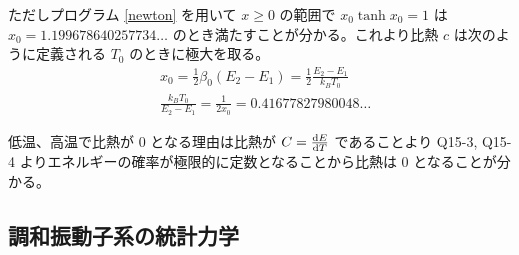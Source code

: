 \documentclass[uplatex,diffipdfmx,a4paper,11pt]{jlreq}
\theoremstyle{definition}
\begin{document}
ただしプログラム \ref{newton} を用いて $x\geq 0$ の範囲で $x_0\tanh x_0 = 1$ は $x_0 = 1.199678640257734\ldots$ のとき満たすことが分かる。これより比熱 $c$ は次のように定義される $T_0$ のときに極大を取る。
\begin{align}
   & x_0 = \frac{1}{2}\beta_0(E_2 - E_1) = \frac{1}{2}\frac{E_2 - E_1}{k_BT_0} \\
   & \frac{k_BT_0}{E_2 - E_1} = \frac{1}{2x_0} =  0.41677827980048\ldots
\end{align}

低温、高温で比熱が 0 となる理由は比熱が $C = \diff{E}{T}$ であることより Q15-3, Q15-4 よりエネルギーの確率が極限的に定数となることから比熱は 0 となることが分かる。

\subsection{調和振動子系の統計力学}
\end{document}
